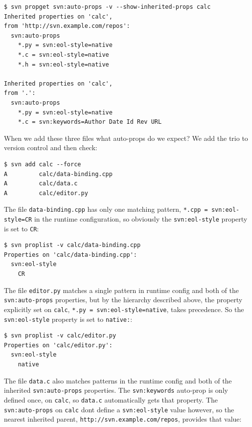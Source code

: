 \begin{verbatim}
$ svn propget svn:auto-props -v --show-inherited-props calc
Inherited properties on 'calc',
from 'http://svn.example.com/repos':
  svn:auto-props
    *.py = svn:eol-style=native
    *.c = svn:eol-style=native
    *.h = svn:eol-style=native

Inherited properties on 'calc',
from '.':
  svn:auto-props
    *.py = svn:eol-style=native
    *.c = svn:keywords=Author Date Id Rev URL
\end{verbatim}

When we add these three files what auto-props do we expect? We add the
trio to version control and then check:

\begin{verbatim}
$ svn add calc --force
A         calc/data-binding.cpp
A         calc/data.c
A         calc/editor.py
\end{verbatim}

The file \texttt{data-binding.cpp} has only one matching pattern,
\texttt{*.cpp\ =\ svn:eol-style=CR} in the runtime configuration, so
obviously the \texttt{svn:eol-style} property is set to \texttt{CR}:

\begin{verbatim}
$ svn proplist -v calc/data-binding.cpp
Properties on 'calc/data-binding.cpp':
  svn:eol-style
    CR
\end{verbatim}

The file \texttt{editor.py} matches a single pattern in runtime config
and both of the \texttt{svn:auto-props} properties, but by the hierarchy
described above, the property explicitly set on \texttt{calc},
\texttt{*.py\ =\ svn:eol-style=native}, takes precedence. So the
\texttt{svn:eol-style} property is set to \texttt{native:}:

\begin{verbatim}
$ svn proplist -v calc/editor.py
Properties on 'calc/editor.py':
  svn:eol-style
    native
\end{verbatim}

The file \texttt{data.c} also matches patterns in the runtime config and
both of the inherited \texttt{svn:auto-props} properties. The
\texttt{svn:keywords} auto-prop is only defined once, on \texttt{calc},
so \texttt{data.c} automatically gets that property. The
\texttt{svn:auto-props} on \texttt{calc} don\textquotesingle t define a
\texttt{svn:eol-style} value however, so the nearest inherited parent,
\texttt{http://svn.example.com/repos}, provides that value:

